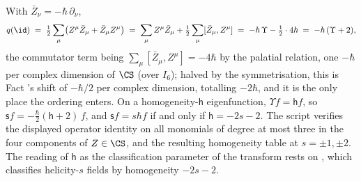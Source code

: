 With $\bar Z_\nu = -\hbar\,\partial_\nu$,
\[
q(\id) \;=\; \tfrac12\sum_\mu\bigl(Z^\mu \bar Z_\mu + \bar Z_\mu Z^\mu\bigr)
\;=\; \sum_\mu Z^\mu \bar Z_\mu + \tfrac12\sum_\mu [\bar Z_\mu, Z^\mu]
\;=\; -\hbar\,\Upsilon - \tfrac12\cdot 4\hbar \;=\; -\hbar\,(\Upsilon + 2),
\]
the commutator term being $\sum_\mu[\bar Z_\mu, Z^\mu] = -4\hbar$ by the palatial relation, one $-\hbar$ per complex dimension of $\CS$ (over $I_6$); halved by the symmetrisation, this is Fact 's shift of $-\hbar/2$ per complex dimension, totalling $-2\hbar$, and it is the only place the ordering enters. On a homogeneity-$\mathsf{h}$ eigenfunction, $\Upsilon f = \mathsf{h} f$, so $\mathsf{s} f = -\tfrac{\hbar}{2}(\mathsf{h} + 2)\,f$, and $\mathsf{s} f = s\hbar f$ if and only if $\mathsf{h} = -2s - 2$. The script verifies the displayed operator identity on all monomials of degree at most three in the four components of $Z \in \CS$, and the resulting homogeneity table at $s = \pm 1, \pm 2$. The reading of $\mathsf{h}$ as the classification parameter of the transform rests on , which classifies helicity-$s$ fields by homogeneity $-2s-2$.
